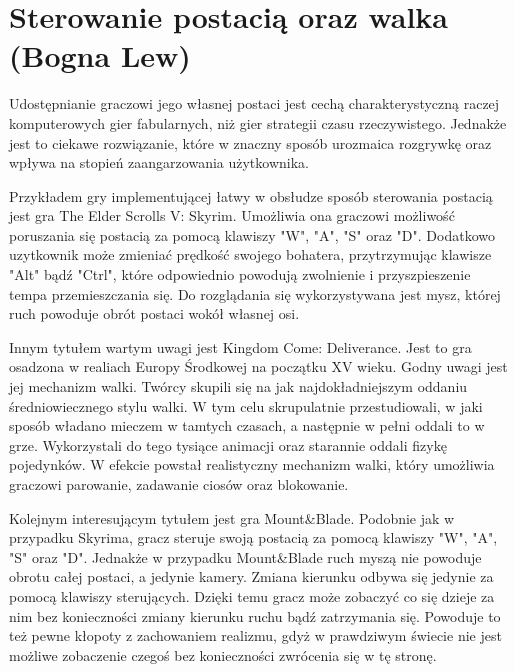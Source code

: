 \section{Sterowanie postacią oraz walka (Bogna Lew)}\label{s:walka}
Udostępnianie graczowi jego własnej postaci jest cechą charakterystyczną raczej komputerowych gier fabularnych, niż gier
strategii czasu rzeczywistego. Jednakże jest to ciekawe rozwiązanie, które w znaczny sposób urozmaica rozgrywkę oraz
wpływa na stopień zaangarzowania użytkownika.

Przykładem gry implementującej łatwy w obsłudze sposób sterowania postacią jest gra The Elder Scrolls V: Skyrim. Umożliwia
ona graczowi możliwość poruszania się postacią za pomocą klawiszy "W", "A", "S" oraz "D". Dodatkowo uzytkownik może
zmieniać prędkość swojego bohatera, przytrzymując klawisze "Alt" bądź "Ctrl", które odpowiednio powodują zwolnienie i
przyszpieszenie tempa przemieszczania się. Do rozglądania się wykorzystywana jest mysz, której ruch powoduje obrót postaci
wokół własnej osi.

Innym tytułem wartym uwagi jest Kingdom Come: Deliverance. Jest to gra osadzona w realiach Europy Środkowej na początku
XV wieku. Godny uwagi jest jej mechanizm walki. Twórcy skupili się na jak najdokładniejszym oddaniu średniowiecznego
stylu walki. W tym celu skrupulatnie przestudiowali, w jaki sposób władano mieczem w tamtych czasach, a następnie w
pełni oddali to w grze. Wykorzystali do tego tysiące animacji oraz starannie oddali fizykę pojedynków. W efekcie powstał
realistyczny mechanizm walki, który umożliwia graczowi parowanie, zadawanie ciosów oraz blokowanie.

Kolejnym interesującym tytułem jest gra Mount\&Blade. Podobnie jak w przypadku Skyrima, gracz steruje swoją postacią za
pomocą klawiszy  "W", "A", "S" oraz "D". Jednakże w przypadku Mount\&Blade ruch myszą nie powoduje obrotu całej postaci,
a jedynie kamery. Zmiana kierunku odbywa się jedynie za pomocą klawiszy sterujących. Dzięki temu gracz może zobaczyć co
się dzieje za nim bez konieczności zmiany kierunku ruchu bądź zatrzymania się. Powoduje to też pewne kłopoty z zachowaniem
realizmu, gdyż w prawdziwym świecie nie jest możliwe zobaczenie czegoś bez konieczności zwrócenia się w tę stronę.